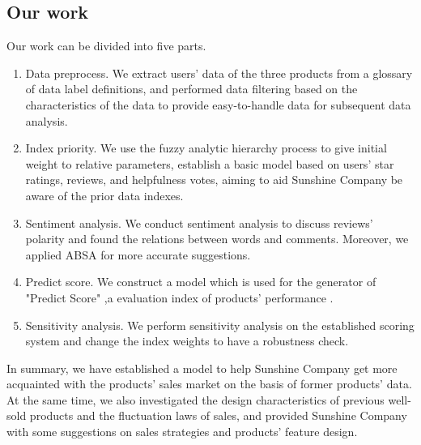 \documentclass[12pt]{article}  %
\begin{document}


\subsection{Our work}
Our work can be divided into five parts.
\begin{enumerate}
    \item Data preprocess. We extract users' data of the three  products from a glossary of data label definitions, and performed data filtering based on the characteristics of the data to provide easy-to-handle data for subsequent data analysis.
    \item Index priority. We use the fuzzy analytic hierarchy process to give initial weight to relative parameters, establish a basic model based on users' star ratings, reviews, and helpfulness votes, aiming to aid Sunshine Company be aware of the prior data indexes.
    \item Sentiment analysis. We conduct sentiment analysis to discuss reviews' polarity and found the relations between words and comments. Moreover, we applied ABSA for more accurate suggestions.
    \item Predict score.  We construct a model which is used for the generator of "Predict Score" ,a evaluation index of products' performance .
    \item Sensitivity analysis. We perform sensitivity analysis on the established scoring system and change the index weights to have a robustness check.
    
    
\end{enumerate}


In summary, we have established a model to help Sunshine Company get more acquainted with the products' sales market on the basis of former products' data. At the same time, we also investigated the design characteristics of previous well-sold products and the fluctuation laws of sales, and provided Sunshine Company with some suggestions on sales strategies and products' feature design.
\end{document}
